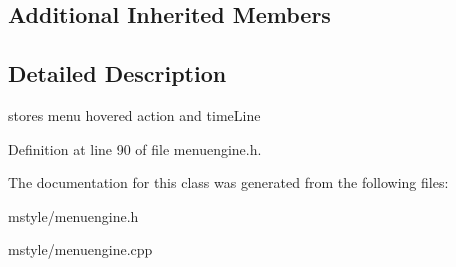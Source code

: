 \subsection*{Additional Inherited Members}


\subsection{Detailed Description}
stores menu hovered action and time\+Line 

Definition at line 90 of file menuengine.\+h.



The documentation for this class was generated from the following files\+:\begin{DoxyCompactItemize}
\item 
mstyle/menuengine.\+h\item 
mstyle/menuengine.\+cpp\end{DoxyCompactItemize}
